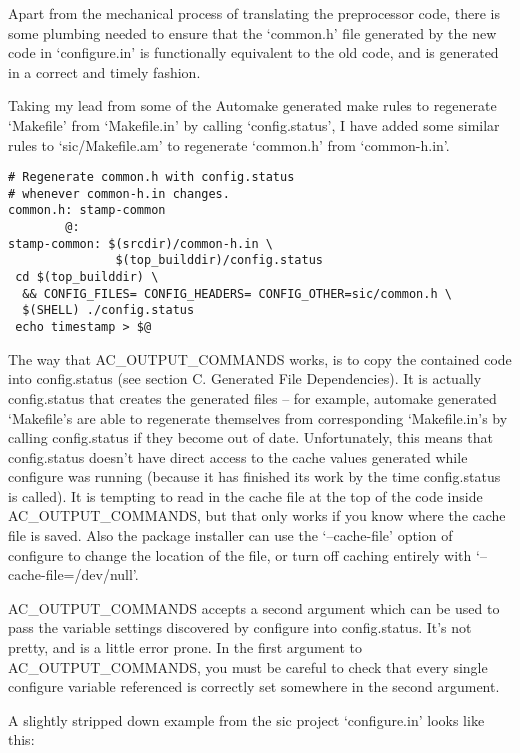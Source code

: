 Apart from the mechanical process of translating the preprocessor code, there is some plumbing needed to ensure that the `common.h' file generated by the new code in `configure.in' is functionally equivalent to the old code, and is generated in a correct and timely fashion.

Taking my lead from some of the Automake generated make rules to regenerate `Makefile' from `Makefile.in' by calling `config.status', I have added some similar rules to `sic/Makefile.am' to regenerate `common.h' from `common-h.in'. 

\begin{Verbatim}[frame=single]
# Regenerate common.h with config.status 
# whenever common-h.in changes.
common.h: stamp-common
        @:
stamp-common: $(srcdir)/common-h.in \
               $(top_builddir)/config.status
 cd $(top_builddir) \
  && CONFIG_FILES= CONFIG_HEADERS= CONFIG_OTHER=sic/common.h \
  $(SHELL) ./config.status
 echo timestamp > $@
\end{Verbatim}

The way that AC\_{}OUTPUT\_{}COMMANDS works, is to copy the contained code into config.status (see section C. Generated File Dependencies). It is actually config.status that creates the generated files -- for example, automake generated
`Makefile's are able to regenerate themselves from corresponding `Makefile.in's by calling config.status if they become out of date. Unfortunately, this means that config.status doesn't have direct access to the cache values generated while configure was running (because it has finished its work by the time config.status is called). It is tempting to read in the cache file at the top of the code inside AC\_{}OUTPUT\_{}COMMANDS, but that only works if you know where the cache file is saved. Also the package installer can use the `--cache-file' option of configure to change the location of the file, or turn off caching entirely with `--cache-file=/dev/null'.

AC\_{}OUTPUT\_{}COMMANDS accepts a second argument which can be used to pass 
the variable settings discovered by configure into config.status. It's not 
pretty, and is a little error prone. In the first argument to \\
AC\_{}OUTPUT\_{}COMMANDS, you must be careful to check that every single configure variable referenced is correctly set somewhere in the second argument.

A slightly stripped down example from the sic project `configure.in' looks like this: 

